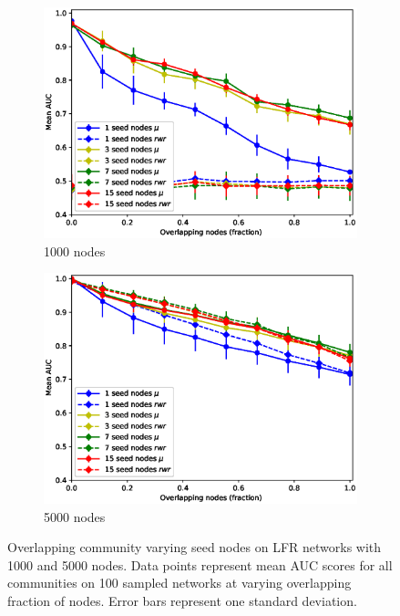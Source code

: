 \documentclass[sigconf]{acmart}
\begin{document}
\begin{figure}[t]
    \centering
    \begin{subfigure}[b]{0.45\textwidth}
        \centering
        \includegraphics[width=\textwidth]{images/lfr_binary_overlap_auc_1000.eps}
        \caption{1000 nodes}
    \end{subfigure}
    \begin{subfigure}[b]{0.45\textwidth}
        \centering
        \includegraphics[width=\textwidth]{images/lfr_binary_overlap_auc_5000.eps}
        \caption{5000 nodes}
    \end{subfigure}
    \caption{Overlapping community varying seed nodes on LFR networks with 1000 and 5000 nodes.
     Data points represent mean AUC scores for all communities on 100 sampled networks at varying overlapping fraction of nodes.
     Error bars represent one standard deviation.}
     \label{fig:auc_overlap}
\end{figure}
\end{document}
